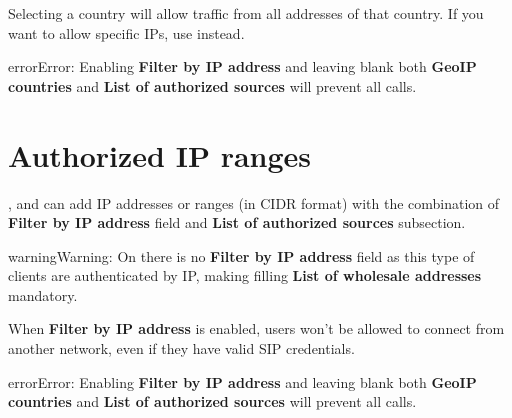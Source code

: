 \documentclass[letterpaper,10pt,english]{sphinxmanual}
\begin{document}
Selecting a country will allow traffic from all addresses of that country. If you want to allow specific IPs, use
{\hyperref[security_and_maintenance/security/authorized_ip_ranges:client\string-authorized\string-ip\string-ranges]{}} instead.

\begin{notice}{error}{Error:}
Enabling \textbf{Filter by IP address} and leaving blank both \textbf{GeoIP countries} and \textbf{List of authorized sources}
will prevent all calls.
\end{notice}
\label{security_and_maintenance/security/authorized_ip_ranges:client-authorized-ip-ranges}

\section{Authorized IP ranges}
\label{security_and_maintenance/security/authorized_ip_ranges:client-authorized-ip-ranges}\label{security_and_maintenance/security/authorized_ip_ranges::doc}\label{security_and_maintenance/security/authorized_ip_ranges:authorized-ip-ranges}\label{security_and_maintenance/security/authorized_ip_ranges:id1}
{\hyperref[administration_portal/client/vpbx/index:vpbx\string-clients]{}}, {\hyperref[administration_portal/client/retail/index:retail\string-clients]{}} and {\hyperref[administration_portal/client/residential/index:residential\string-clients]{}} can add IP addresses or ranges
(in CIDR format) with the combination of \textbf{Filter by IP address} field and \textbf{List of authorized sources} subsection.

\begin{notice}{warning}{Warning:}
On {\hyperref[administration_portal/client/wholesale/index:wholesale\string-clients]{}} there is no \textbf{Filter by IP address} field as this type of clients are authenticated by IP, making
filling \textbf{List of wholesale addresses} mandatory.
\end{notice}

When \textbf{Filter by IP address} is enabled, users won't be allowed to connect from another network, even if they have
valid SIP credentials.

\begin{notice}{error}{Error:}
Enabling \textbf{Filter by IP address} and leaving blank both \textbf{GeoIP countries} and \textbf{List of authorized sources}
will prevent all calls.
\end{notice}
\end{document}
